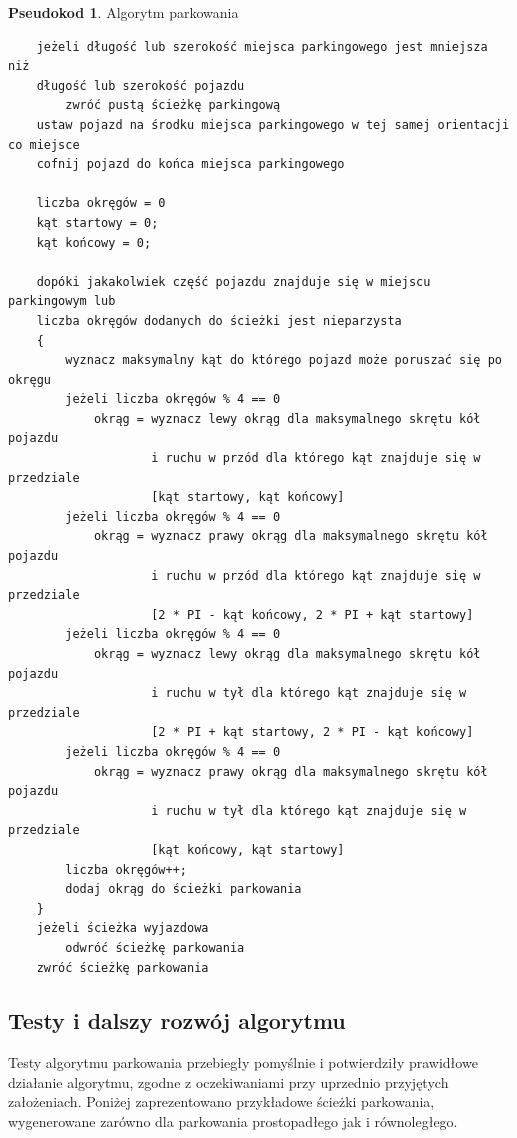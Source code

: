 \documentclass[a4paper,11pt,twoside]{report}
\theoremstyle{definition}
\newtheorem{pseudokod}{Pseudokod}[subsection]
\begin{document}
\begin{pseudokod}
Algorytm parkowania
\begin{verbatim}
    jeżeli długość lub szerokość miejsca parkingowego jest mniejsza niż 
    długość lub szerokość pojazdu
        zwróć pustą ścieżkę parkingową
    ustaw pojazd na środku miejsca parkingowego w tej samej orientacji co miejsce
    cofnij pojazd do końca miejsca parkingowego

    liczba okręgów = 0
    kąt startowy = 0;
    kąt końcowy = 0;
	
    dopóki jakakolwiek część pojazdu znajduje się w miejscu parkingowym lub 
    liczba okręgów dodanych do ścieżki jest nieparzysta
    {
        wyznacz maksymalny kąt do którego pojazd może poruszać się po okręgu
        jeżeli liczba okręgów % 4 == 0
            okrąg = wyznacz lewy okrąg dla maksymalnego skrętu kół pojazdu 
                    i ruchu w przód dla którego kąt znajduje się w przedziale 
                    [kąt startowy, kąt końcowy]
        jeżeli liczba okręgów % 4 == 0
            okrąg = wyznacz prawy okrąg dla maksymalnego skrętu kół pojazdu 
                    i ruchu w przód dla którego kąt znajduje się w przedziale 
                    [2 * PI - kąt końcowy, 2 * PI + kąt startowy]
        jeżeli liczba okręgów % 4 == 0
            okrąg = wyznacz lewy okrąg dla maksymalnego skrętu kół pojazdu 
                    i ruchu w tył dla którego kąt znajduje się w przedziale 
                    [2 * PI + kąt startowy, 2 * PI - kąt końcowy]
        jeżeli liczba okręgów % 4 == 0
            okrąg = wyznacz prawy okrąg dla maksymalnego skrętu kół pojazdu 
                    i ruchu w tył dla którego kąt znajduje się w przedziale 
                    [kąt końcowy, kąt startowy]
        liczba okręgów++;
        dodaj okrąg do ścieżki parkowania
    }
    jeżeli ścieżka wyjazdowa
        odwróć ścieżkę parkowania	
    zwróć ścieżkę parkowania
\end{verbatim}
\end{pseudokod}

\subsection{Testy i dalszy rozwój algorytmu}

Testy algorytmu parkowania przebiegły pomyślnie i potwierdziły prawidłowe działanie algorytmu, zgodne z oczekiwaniami przy uprzednio przyjętych założeniach. Poniżej zaprezentowano przykładowe ścieżki parkowania, wygenerowane zarówno dla parkowania prostopadłego jak i równoległego.
\end{document}
